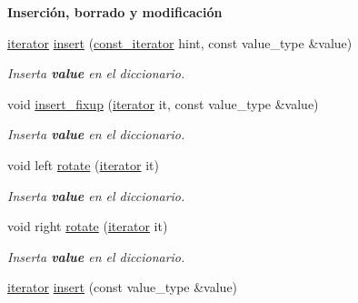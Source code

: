 \begin{Indent}{\bf \-Inserción, borrado y modificación}\par
\begin{DoxyCompactItemize}
\item 
\hyperlink{classaed2_1_1iterator_1_1iterator}{iterator} \hyperlink{classaed2_1_1iterator_ab9446668ad5619115b6c4a10eac83d68_ab9446668ad5619115b6c4a10eac83d68}{insert} (\hyperlink{classaed2_1_1iterator_1_1const__iterator}{const\-\_\-iterator} hint, const value\-\_\-type \&value)
\begin{DoxyCompactList}\small\item\em \-Inserta {\bfseries value} en el diccionario. \end{DoxyCompactList}\item 
void \hyperlink{classaed2_1_1iterator_ab23378eb6149357e1a2167e9804eb6e3_ab23378eb6149357e1a2167e9804eb6e3}{insert\-\_\-fixup} (\hyperlink{classaed2_1_1iterator_1_1iterator}{iterator} it, const value\-\_\-type \&value)
\begin{DoxyCompactList}\small\item\em \-Inserta {\bfseries value} en el diccionario. \end{DoxyCompactList}\item 
void left \hyperlink{classaed2_1_1iterator_af4e447a081108196ecdf39b16ecb5303_af4e447a081108196ecdf39b16ecb5303}{rotate} (\hyperlink{classaed2_1_1iterator_1_1iterator}{iterator} it)
\begin{DoxyCompactList}\small\item\em \-Inserta {\bfseries value} en el diccionario. \end{DoxyCompactList}\item 
void right \hyperlink{classaed2_1_1iterator_a191eae4f3f076914ff1560a2fa833b70_a191eae4f3f076914ff1560a2fa833b70}{rotate} (\hyperlink{classaed2_1_1iterator_1_1iterator}{iterator} it)
\begin{DoxyCompactList}\small\item\em \-Inserta {\bfseries value} en el diccionario. \end{DoxyCompactList}\item 
\hyperlink{classaed2_1_1iterator_1_1iterator}{iterator} \hyperlink{classaed2_1_1iterator_aa1870e8bfa4f45c82fa1ee076846922b_aa1870e8bfa4f45c82fa1ee076846922b}{insert} (const value\-\_\-type \&value)
\end{DoxyCompactItemize}
\end{Indent}
